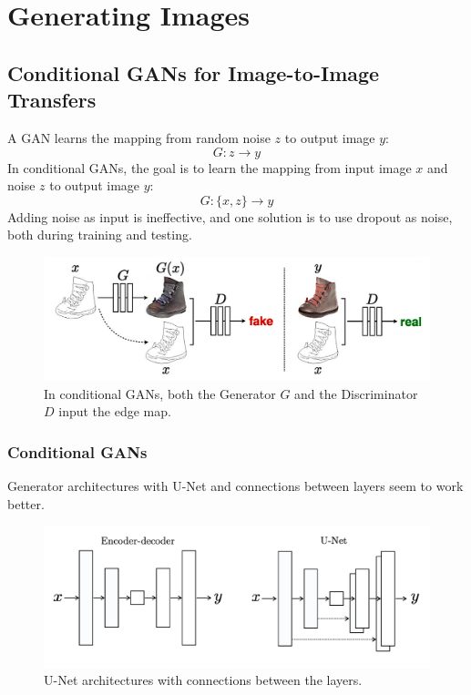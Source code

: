 \section{Generating Images}

\subsection{Conditional GANs for Image-to-Image Transfers}
A GAN learns the mapping from random noise $z$ to output image $y$:
\begin{equation*}
	G: z \rightarrow y
\end{equation*}
In conditional GANs, the goal is to learn the mapping from input image $x$ and noise $z$ to output image $y$:
\begin{equation*}
	G: \{x,z\} \rightarrow y
\end{equation*}
Adding noise as input is ineffective, and one solution is to use dropout as noise, both during training and testing.

\begin{figure}[H]
	\centering
	\includegraphics[width=0.7\linewidth]{img/conditional_GAN_edge_map}
	\caption{In conditional GANs, both the Generator $G$ and the Discriminator $D$ input the edge map.}
	\label{fig:conditionalganedgemap}
\end{figure}

\subsubsection{Conditional GANs}
Generator architectures with U-Net and connections between layers seem to work better.

\begin{figure}[H]
	\centering
	\includegraphics[width=0.7\linewidth]{img/conditional_GAN_generator_architectures}
	\caption{U-Net architectures with connections between the layers.}
	\label{fig:conditionalgangeneratorarchitectures}
\end{figure}

